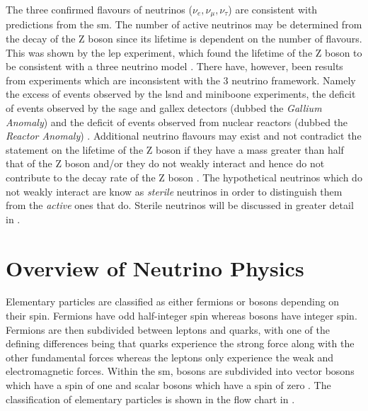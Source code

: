 The three confirmed flavours of neutrinos ($\nu_e, \nu_{\mu}, \nu_{\tau}$) are consistent with predictions from the \Gls{sm}. The number of active neutrinos may be determined from the decay of the Z boson since its lifetime is dependent on the number of flavours. This was shown by the \gls{lep} experiment, which found the lifetime of the Z boson to be consistent with a three neutrino model \cite{Zboson_number_of_neutrinos}\cite{LEP}. There have, however, been results from experiments which are inconsistent with the 3 neutrino framework. Namely the excess of events observed by the \gls{lsnd} and \gls{miniboone} experiments, the deficit of events observed by the \gls{sage} and \gls{gallex} detectors (dubbed the \textit{Gallium Anomaly}) and the deficit of events observed from nuclear reactors (dubbed the \textit{Reactor Anomaly}) \cite{LSND_excess} \cite{MiniBooNE_excess} \cite{GALLEX} \cite{Gallex_reanalysis} \cite{SAGE} \cite{Reactor_anomaly}. Additional neutrino flavours may exist and not contradict the statement on the lifetime of the Z boson if they have a mass greater than half that of the Z boson and/or they do not weakly interact and hence do not contribute to the decay rate of the Z boson \cite{Zboson_number_of_neutrinos}. The hypothetical neutrinos which do not weakly interact are know as \textit{sterile} neutrinos in order to distinguish them from the \textit{active} ones that do. Sterile neutrinos will be discussed in greater detail in .

\section{Overview of Neutrino Physics}\label{sec:neutrino_physics}

Elementary particles are classified as either fermions or bosons depending on their spin. Fermions have odd half-integer spin whereas bosons have integer spin. Fermions are then subdivided between leptons and quarks, with one of the defining differences being that quarks experience the strong force along with the other fundamental forces whereas the leptons only experience the weak and electromagnetic forces. Within the \gls{sm}, bosons are subdivided into vector bosons which have a spin of one and scalar bosons which have a spin of zero \cite{Particles_and_Fundamental_Interactions:_An_Introduction_to_Particle_Physics}. The classification of elementary particles is shown in the flow chart in .

